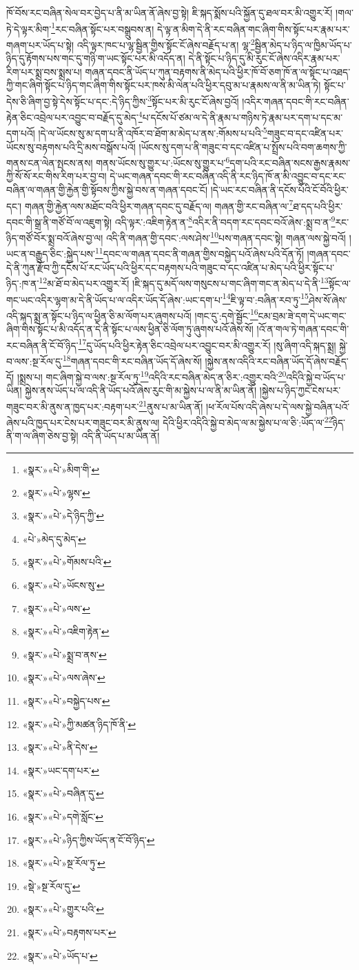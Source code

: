 ཁོ་བོས་རང་བཞིན་སེལ་བར་བྱེད་པ་ནི་མ་ཡིན་ནོ་ཞེས་བྱ་སྟེ། ཇི་སྐད་སྨོས་པའི་སྐྱོན་དུ་ཐལ་བར་མི་འགྱུར་རོ། །གལ་ཏེ་དེ་ལྟར་མིག་\footnote{«སྣར་»«པེ་»མིག་གི་}རང་བཞིན་སྟོང་པར་བསྒྲུབས་ན། དེ་ལྟ་ན་མིག་དེ་ནི་རང་བཞིན་གང་ཞིག་གིས་སྟོང་པར་རྣམ་པར་གཞག་པར་ཡོད་པ་སྟེ། འདི་ལྟར་ཁང་པ་ལྷ་སྦྱིན་གྱིས་སྟོང་ངོ་ཞེས་བརྗོད་པ་ན། ལྷ་\footnote{«སྣར་»«པེ་»ལྷས་}སྦྱིན་མེད་པ་ཉིད་ལ་ཁྱིམ་ཡོད་པ་ཉིད་དུ་རྟོགས་པས་གང་དུ་གཉི་ག་ཡང་སྟོང་པར་མི་འདོད་ན། དེ་ནི་སྟོང་པ་ཉིད་དུ་མི་རུང་ངོ་ཞེས་འདིར་རྣམ་པར་རིག་པར་སྨྲ་བས་སྨྲས་པ། གཞན་དབང་ནི་ཡོད་པ་ཀུན་བརྟགས་ནི་མེད་པའི་ཕྱིར་ཁོ་བོ་ཅག་ཁོ་ན་ལ་སྟོང་པ་འཐད་ཀྱི་གང་ཞིག་སྟོང་པ་ཉིད་གང་ཞིག་གིས་སྟོང་པར་ཁས་མི་ལེན་པའི་ཕྱིར་དབུ་མ་པ་རྣམས་ལ་ནི་མ་ཡིན་ཏེ། སྟོང་པ་དེས་ཅི་ཞིག་བྱ་སྟེ་དེས་སྟོང་པ་དང་:དེ་ཉིད་ཀྱིས་\footnote{«སྣར་»«པེ་»དེ་ཉིད་ཀྱི་}སྟོང་པར་མི་རུང་ངོ་ཞེས་བྱའོ། །འདིར་གཞན་དབང་གི་རང་བཞིན་རྟེན་ཅིང་འབྲེལ་པར་འབྱུང་བ་བརྗོད་དུ་མེད་\footnote{«པེ་»མེད་དུ་མེད་}པ་དངོས་པོ་ཙམ་ལ་དེ་ནི་རྣམ་པ་གཉིས་ཏེ་རྣམ་པར་དག་པ་དང་མ་དག་པའོ། །དེ་ལ་ཡོངས་སུ་མ་དག་པ་ནི་འཁོར་བ་ཐོག་མ་མེད་པ་ནས་:གོམས་པ་པའི་\footnote{«སྣར་»«པེ་»གོམས་པའི་}གཟུང་བ་དང་འཛིན་པར་ཡོངས་སུ་བརྟགས་པའི་དྲི་མས་བསྒོས་པའོ། །ཡོངས་སུ་དག་པ་ནི་གཟུང་བ་དང་འཛིན་པ་སྤྲོས་པའི་བག་ཆགས་ཀྱི་གནས་ངན་ལེན་སྤངས་ནས། གནས་ཡོངས་སུ་གྱུར་པ་:ཡོངས་སུ་གྱུར་པ་\footnote{«སྣར་»«པེ་»ཡོངས་སུ་}དག་པའི་རང་བཞིན་སངས་རྒྱས་རྣམས་ཀྱི་སོ་སོ་རང་གིས་རིག་པར་བྱ་བ། དེ་ཡང་གཞན་དབང་གི་རང་བཞིན་འདི་ནི་རང་ཉིད་ཁོ་ན་མི་འབྱུང་བ་དང་རང་བཞིན་ལ་གཞན་གྱི་རྐྱེན་གྱི་སྟོབས་ཀྱིས་སྐྱེ་བས་ན་གཞན་དབང་ངོ། །དེ་ཡང་རང་བཞིན་ནི་དངོས་པོའི་ངོ་བོའི་ཕྱིར་དང་། གཞན་གྱི་རྐྱེན་ལས་མཐོང་བའི་ཕྱིར་གཞན་དབང་དུ་བརྗོད་ལ། གཞན་གྱི་རང་བཞིན་ལ་\footnote{«སྣར་»«པེ་»ལས་}ཐ་དད་པའི་ཕྱིར་དབང་གི་སྒྲ་ནི་གཙོ་བོ་ལ་འཇུག་སྟེ། འདི་ལྟར་:འཇིག་རྟེན་ན་\footnote{«སྣར་»«པེ་»འཇིག་རྟེན་}འདིར་ནི་བདག་རང་དབང་བའོ་ཞེས་:སྨྲ་བ་ན་\footnote{«སྣར་»«པེ་»སྨྲ་བ་ནས་}རང་ཉིད་གཙོ་བོར་སྨྲ་བའོ་ཞེས་བྱ་ལ། འདི་ནི་གཞན་གྱི་དབང་:ལས་ཤེས་\footnote{«སྣར་»«པེ་»ལས་ཞེས་}པས་གཞན་དབང་སྟེ། གཞན་ལས་སྐྱེ་བའོ། །ཡང་ན་བརྒྱུད་ཅིང་:སྐྱེད་པས་\footnote{«སྣར་»«པེ་»བསྐྱེད་པས་}དབང་ལ་གཞན་དབང་ནི་གཞན་གྱིས་བསྐྱེད་པའོ་ཞེས་པའི་དོན་ཏོ། །གཞན་དབང་དེ་ནི་ཀུན་རྫོབ་ཀྱི་དངོས་པོ་རང་ཡོད་པའི་ཕྱིར་དང་བརྟགས་པའི་གཟུང་བ་དང་འཛིན་པ་མེད་པའི་ཕྱིར་སྟོང་པ་ཉིད་:ཁ་ན་\footnote{«སྣར་»«པེ་»ཀྱི་མཚན་ཉིད་ཁོ་ནི་}མ་ཐོ་བ་མེད་པར་འགྱུར་རོ། །ཇི་སྐད་དུ་མདོ་ལས་གསུངས་པ་གང་ཞིག་གང་ན་མེད་པ་དེ་ནི་\footnote{«སྣར་»«པེ་»ནི་དེས་}སྟོང་ལ་གང་ཡང་འདིར་ལྷག་མ་དེ་ནི་ཡོད་པ་ལ་འདིར་ཡོད་དོ་ཞེས་:ཡང་དག་པ་\footnote{«སྣར་»ཡང་དག་པར་}ཇི་ལྟ་བ་:བཞིན་རབ་ཏུ་\footnote{«སྣར་»«པེ་»བཞིན་དུ་}ཤེས་སོ་ཞེས་འདི་སྐད་སྨྲ་ན་སྟོང་པ་ཉིད་ལ་ཕྱིན་ཅི་མ་ལོག་པར་ཞུགས་པའོ། །གང་དུ་:དགེ་སྦྱོང་\footnote{«སྣར་»«པེ་»དགེ་སློང་}ངམ་བྲམ་ཟེ་དག་དེ་ཡང་གང་ཞིག་གིས་སྟོང་པ་མི་འདོད་ན་དེ་ནི་སྟོང་པ་ལས་ཕྱིན་ཅི་ལོག་ཏུ་ཞུགས་པའོ་ཞེས་སོ། །འོ་ན་གལ་ཏེ་གཞན་དབང་གི་རང་བཞིན་ནི་ངོ་བོ་ཉིད་\footnote{«སྣར་»«པེ་»ཉིད་ཀྱིས་ཡོད་ན་ངོ་བོ་ཉིད་}དུ་ཡོད་པའི་ཕྱིར་རྟེན་ཅིང་འབྲེལ་པར་འབྱུང་བར་མི་འགྱུར་རོ། །སུ་ཞིག་འདི་སྐད་སྨྲ། སྐྱེ་བ་ལས་:སྔ་རོལ་དུ་\footnote{«སྣར་»«པེ་»སྔ་རོལ་ཏུ་}གཞན་དབང་གི་རང་བཞིན་ཡོད་དོ་ཞེས་སོ། །སྐྱེས་ནས་འདིའི་རང་བཞིན་ཡོད་དོ་ཞེས་བརྗོད་དོ། །སྨྲས་པ། གང་ཞིག་སྐྱེ་བ་ལས་:སྔ་རོལ་ཏུ་\footnote{«སྡེ་»སྔ་རོལ་དུ་}འདིའི་རང་བཞིན་མེད་ན་ཅིར་:འགྱུར་བའི་\footnote{«སྣར་»«པེ་»གྱུར་པའི་}འདིའི་སྐྱེ་བ་ཡོད་པ་ཡིན། སྐྱེས་ནས་ཡོད་པ་ལ་འདི་ནི་ཡོད་པའོ་ཞེས་རུང་གི་མ་སྐྱེས་པ་ལ་ནི་མ་ཡིན་ནོ། །སྐྱེས་པ་ཉིད་ཀྱང་ངེས་པར་གཟུང་བར་མི་ནུས་ན་ཁྱད་པར་:བརྟག་པར་\footnote{«སྣར་»«པེ་»བརྟགས་པར་}ནུས་པ་མ་ཡིན་ནོ། །ཕ་རོལ་པོས་འདི་ཞེས་པ་དེ་ལས་སྐྱེ་བཞིན་པའོ་ཞེས་པའི་ཁྱད་པར་ངེས་པར་གཟུང་བར་མི་ནུས་ལ། དེའི་ཕྱིར་འདིའི་སྐྱེ་བ་མེད་ལ་མ་སྐྱེས་པ་ལ་ཅི་:ཡོད་ལ་\footnote{«སྣར་»«པེ་»ཡོད་པ་}ཉིད་ནི་ག་ལ་ཞིག་ཅེས་བྱ་སྟེ། འདི་ནི་ཡོད་པ་མ་ཡིན་ནོ། 